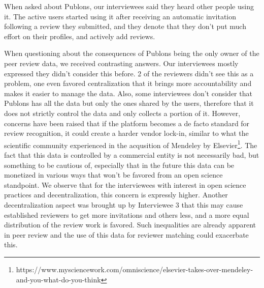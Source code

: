 When asked about Publons, our interviewees said they heard other people using it. The active users started using it after receiving an automatic invitation following a review they submitted, and they denote that they don't put much effort on their profiles, and actively add reviews. 

When questioning about the consequences of Publons being the only owner of the peer review data, we received contrasting answers. Our interviewees mostly expressed they didn't consider this before. 2 of the reviewers didn't see this as a problem, one even favored centralization that it brings more accountability and makes it easier to manage the data. Also, some interviewees don't consider that Publons has all the data but only the ones shared by the users, therefore that it does not strictly control the data and only collects a portion of it. However, concerns have been raised that if the platform becomes a de facto standard for review recognition, it could create a harder vendor lock-in, similar to what the scientific community experienced in the acqusition of Mendeley by Elsevier\footnote{https://www.mysciencework.com/omniscience/elsevier-takes-over-mendeley-and-you-what-do-you-think}. The fact that this data is controlled by a commercial entity is not necessarily bad, but something to be cautious of, especially that in the future this data can be monetized in various ways that won't be favored from an open science standpoint. We observe that for the interviewees with interest in open science practices and decentralization, this concern is expressly higher. Another decentralization aspect was brought up by Interviewee 3 that this may cause established reviewers to get more invitations and others less, and a more equal distribution of the review work is favored. Such inequalities are already apparent in peer review \parencite{Warne.2016, Publons.2018,Ware.2008, Hochberg.2009} and the use of this data for reviewer matching could exacerbate this. 

